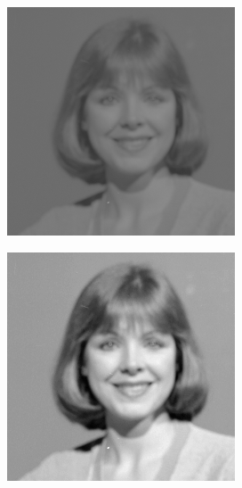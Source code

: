 \documentclass{article}
\begin{document}
\begin{figure}[h]
\begin{subfigure}{.3\textwidth}
  \centering
  \includegraphics[width=0.97\linewidth]{_Figures/sample_4.png}
  \caption{}
   \label{fig:raw_hist_4}
\end{subfigure}%
\begin{subfigure}{.3\textwidth}
  \centering
  \includegraphics[width=0.97\linewidth]{_Figures/sample_4_normalization_average.png}

\end{subfigure}
\end{figure}
\end{document}
